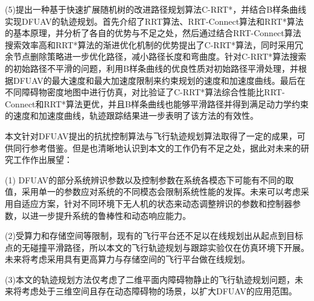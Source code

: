 (5)提出一种基于快速扩展随机树的改进路径规划算法C-RRT*，并结合B样条曲线实现DFUAV的轨迹规划。首先介绍了RRT算法、RRT-Connect算法和RRT*算法的基本原理，并分析了各自的优势与不足之处，然后通过结合RRT-Connect算法搜索效率高和RRT*算法的渐进优化机制的优势提出了C-RRT*算法，同时采用冗余节点删除策略进一步优化路径，减小路径长度和弯曲度。针对C-RRT*算法搜索的初始路径不平滑的问题，利用B样条曲线的优良性质对初始路径平滑处理，并根据DFUAV的最大速度和最大加速度限制来约束规划的速度和加速度曲线。最后在不同障碍物密度地图中进行仿真，对比验证了C-RRT*算法综合性能比RRT-Connect和RRT*算法更优，并且B样条曲线也能够平滑路径并得到满足动力学约束的速度和加速度曲线，轨迹跟踪结果进一步表明了该方法的有效性。

本文针对DFUAV提出的抗扰控制算法与飞行轨迹规划算法取得了一定的成果，可供同行参考借鉴。但是也清晰地认识到本文的工作仍有不足之处，据此对未来的研究工作作出展望：

(1) DFUAV的部分系统辨识参数以及控制参数在系统各模态下可能有不同的取值，采用单一的参数应对系统的不同模态会限制系统性能的发挥。未来可以考虑采用自适应方案，针对不同环境下无人机的状态来动态调整辨识的参数和控制器参数，以进一步提升系统的鲁棒性和动态响应能力。

(2)受算力和存储空间等限制，现有的飞行平台还不足以在线规划出从起点到目标点的无碰撞平滑路径，所以本文的飞行轨迹规划与跟踪实验仅在仿真环境下开展。未来将考虑采用具有更高算力与存储空间的飞行平台做在线规划。

(3)本文的轨迹规划方法仅考虑了二维平面内障碍物静止的飞行轨迹规划问题，未来将考虑处于三维空间且存在动态障碍物的场景，以扩大DFUAV的应用范围。

